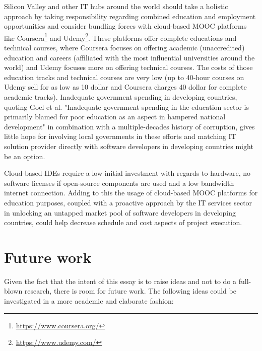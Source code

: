 \documentclass[a4paper, 10pt, conference]{ieeeconf}
\begin{document}
Silicon Valley and other IT hubs around the world should take a holistic approach by taking responsibility regarding combined education and employment opportunities and consider bundling forces with cloud-based MOOC platforms like Coursera\footnote{\url{https://www.coursera.org/}} and Udemy\footnote{\url{https://www.udemy.com/}}. These platforms offer complete educations and technical courses, where Coursera focuses on offering  academic (unaccredited) education and careers (affiliated with the most influential universities around the world) and Udemy focuses more on offering technical courses. The costs of those education tracks and technical courses are very low (up to 40-hour courses on Udemy sell for as low as 10 dollar and Coursera charges 40 dollar for complete academic tracks). Inadequate government spending in developing countries, quoting Goel et al. \cite{Goel2012} "Inadequate government spending in the education sector is primarily blamed for poor education as an aspect in hampered national development" in combination with a multiple-decades history of corruption, gives little hope for involving local governments in these efforts and matching IT solution provider directly with software developers in developing countries might be an option.

\vspace{3 mm}
Cloud-based IDEs require a low initial investment with regards to hardware, no software licenses if open-source components are used and a low bandwidth internet connection. Adding to this the usage of cloud-based MOOC platforms for education purposes, coupled with a proactive approach by the IT services sector in unlocking an untapped market pool of software developers in developing countries, could help decrease schedule and cost aspects of project execution.

\section{Future work}

Given the fact that the intent of this essay is to raise ideas and not to do a full-blown research, there is room for future work. The following ideas could be investigated in a more academic and elaborate fashion:

\vspace{3 mm}
\end{document}
